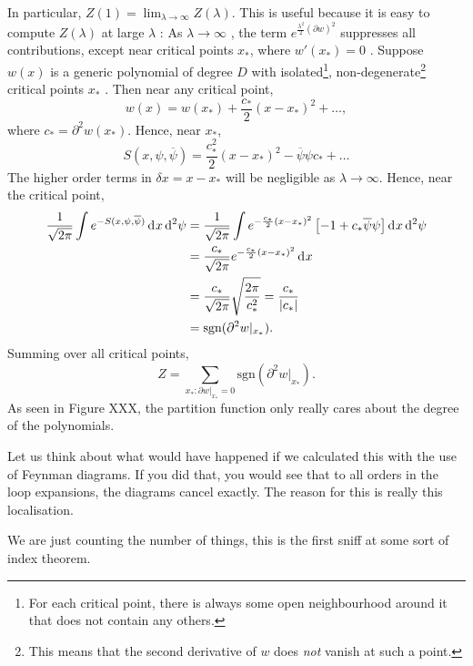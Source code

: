 In particular, $ Z(1) = \lim_{\lambda \to \infty}  Z(\lambda) $. This is useful because it is easy to compute $Z(\lambda)$  at large $\lambda$ : As $\lambda \to \infty$ , the term $e^{\frac{\lambda^2}{2} (\partial w)^2}$  suppresses all contributions, except near critical points $x_*$, where  $w'(x_*) = 0$ .
Suppose $w(x)$  is a generic polynomial of degree $D$ with isolated\footnote{For each critical point, there is always some open neighbourhood around it that does not contain any others.}, non-degenerate\footnote{This means that the second derivative of $w$ does \emph{not} vanish at such a point.} critical points  $x_*$ .
Then near any critical point, 
\begin{equation}
  w(x) = w(x_*) + \frac{c_*}{2} (x-x_*)^2 + \dots,
\end{equation} 
where $c_* = \partial^2 w(x_*)$.
Hence, near $x_*$,
\begin{equation}
  S(x, \psi, \overline{\psi}) = \frac{c_*^2}{2} (x - x_*)^2 - \overline{\psi}\psi c_* + \dots
\end{equation}
The higher order terms in $\delta x = x - x_*$ will be negligible as $\lambda \to \infty$.
Hence, near the critical point,
\begin{align}
  \frac{1}{\sqrt{2\pi}} \int e^{-S(x, \psi, \overline{\psi})} \dd[]{x} \dd[2]{\psi} &= \frac{1}{\sqrt{2\pi}} \int e^{-\frac{c_*}{2} (x  -x_*)^2} \left[ -1 + c_* \overline{\psi} \psi \right] \dd[]{x} \dd[2]{\psi} \\
										    &= \frac{c_*}{\sqrt{ 2 \pi}} e^{-\frac{c_*}{2} (x - x_*)^2} \dd[]{x} \\
										    &= \frac{c_*}{\sqrt{ 2 \pi}} \sqrt{\frac{2 \pi}{c_*^2}} = \frac{c_*}{\abs{c_*}} \\
										    &= \text{sgn}(\partial^2 w \rvert_{x_*}).
\end{align}
Summing over all critical points, 
\begin{equation}
  Z = \sum_{x_*: \partial w\rvert_{x_*} = 0} \text{sgn}(\partial^2 w\rvert_{x_*}).
\end{equation}
As seen in Figure XXX, the partition function only really cares about the degree of the polynomials.

Let us think about what would have happened if we calculated this with the use of Feynman diagrams.
If you did that, you would see that to all orders in the loop expansions, the diagrams cancel exactly.
The reason for this is really this localisation.

We are just counting the number of things, this is the first sniff at some sort of index theorem.
